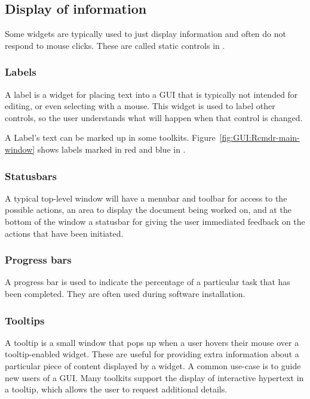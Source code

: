 \subsection{Display of information}
\label{sec:GUI:info-display}

Some widgets are typically used to just display information and often
do not respond to mouse clicks. These are called static controls in
\wxWidgets.

\subsubsection{Labels}
\label{sec:GUI:labels}
A label is a widget for placing text into a GUI that is typically not
intended for editing, or even selecting with a mouse. This widget is
used to label other controls, so the user understands what will happen
when that control is changed.

A Label's text can be marked up in some
toolkits. Figure~\ref{fig:GUI:Rcmdr-main-window} shows labels marked
in red and blue in .

\subsubsection{Statusbars}
\label{sec:GUI:statusbars}

A typical top-level window will have a menubar and toolbar for access
to the possible actions, an area to display the document being worked
on, and at the bottom of the window a statusbar for giving the user
immediated feedback on the actions that have been
initiated. 

\subsubsection{Progress bars}

A progress bar is used to indicate the percentage of a particular task
that has been completed. They are often used during software installation. 


\subsubsection{Tooltips}
\label{sec:GUI:basic-tooltips}

A tooltip is a small window that pops up when a user hovers their
mouse over a tooltip-enabled widget. These are useful for providing
extra information about a particular piece of content displayed by a
widget. A common use-case is to guide new users of a GUI. Many
toolkits support the display of interactive hypertext in a tooltip,
which allows the user to request additional details.

